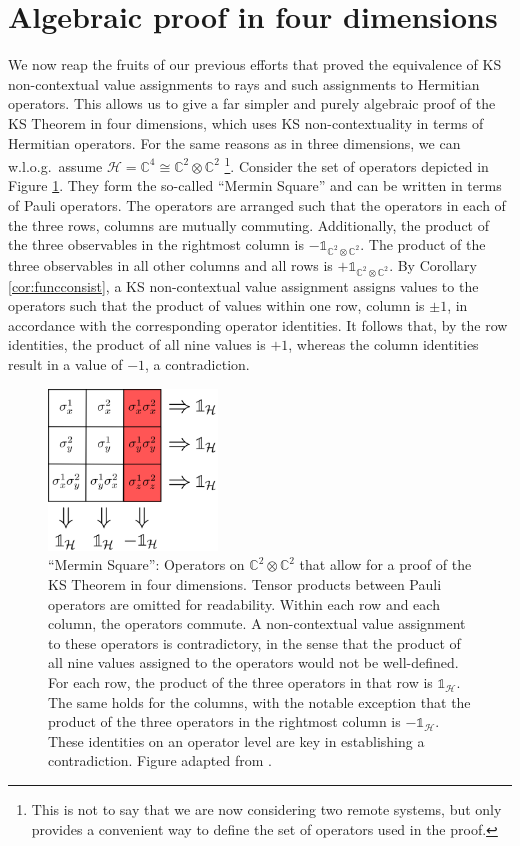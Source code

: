 \section{Algebraic proof in four dimensions}
\label{sec:4dim}
We now reap the fruits of our previous efforts that proved the equivalence of KS non-contextual value assignments to rays and such assignments to Hermitian operators. This allows us to give a far simpler and purely algebraic proof of the KS Theorem in four dimensions, which uses KS non-contextuality in terms of Hermitian operators. For the same reasons as in three dimensions, we can w.l.o.g.\ assume $\mathcal{H=\mathbb{C}}^{4}\cong\mathbb{C}^{2}\otimes\mathbb{C}^{2}$ \footnote{This is not to say that we are now considering two remote systems, but only provides a convenient way to define the set of operators used in the proof.}. Consider the set of operators depicted in Figure \ref{fig:4dim}. They form the so-called “Mermin Square” \cite{Mermin1993} and can be written in terms of Pauli operators. The operators are arranged such that the operators in each of the three rows, columns are mutually commuting. Additionally, the product of the three observables in the rightmost column is $-\mathbb{1}_{\mathbb{C}^{2}\otimes\mathbb{C}^{2}}$. The product of the three observables in all other columns and all rows is $+\mathbb{1}_{\mathbb{C}^{2}\otimes\mathbb{C}^{2}}$. By Corollary \ref{cor:funcconsist}, a KS non-contextual value assignment assigns values to the operators such that the product of values within one row, column is $\pm1$, in accordance with the corresponding operator identities. It follows that, by the row identities, the product of all nine values is $+1$, whereas the column identities result in a value of $-1$, a contradiction.

\begin{figure}
    \centering
    \includegraphics[width=0.4\textwidth]{images/4dim.png}
    \caption{``Mermin Square'': Operators on $\mathbb{C}^{2}\otimes\mathbb{C}^{2}$ that allow for a proof of the KS Theorem in four dimensions. Tensor products between Pauli operators are omitted for readability. Within each row and each column, the operators commute. A non-contextual value assignment to these operators is contradictory, in the sense that the product of all nine values assigned to the operators would not be well-defined. For each row, the product of the three operators in that row is $\mathbb{1}_\mathcal{H}$. The same holds for the columns, with the notable exception that the product of the three operators in the rightmost column is $-\mathbb{1}_\mathcal{H}$. These identities on an operator level are key in establishing a contradiction. Figure adapted from \cite{Mermin1993}.}
    \label{fig:4dim}
\end{figure}

